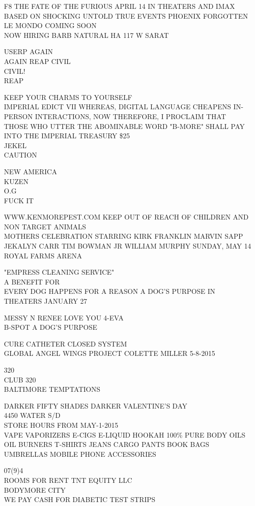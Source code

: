 \documentclass[10pt,letterpaper]{article}
\begin{document}
F8 THE FATE OF THE FURIOUS APRIL 14 IN THEATERS AND IMAX\\
BASED ON SHOCKING UNTOLD TRUE EVENTS PHOENIX FORGOTTEN\\
LE MONDO COMING SOON\\
NOW HIRING BARB NATURAL HA 117 W SARAT

USERP AGAIN\\
AGAIN REAP CIVIL\\
CIVIL!\\
REAP

KEEP YOUR CHARMS TO YOURSELF\\
IMPERIAL EDICT VII WHEREAS, DIGITAL LANGUAGE CHEAPENS IN{-}PERSON INTERACTIONS, NOW THEREFORE, I PROCLAIM THAT THOSE WHO UTTER THE ABOMINABLE WORD "B{-}MORE" SHALL PAY INTO THE IMPERIAL TREASURY \$25\\
JEKEL\\
CAUTION

NEW AMERICA\\
KUZEN\\
O.G\\
FUCK IT

WWW.KENMOREPEST.COM KEEP OUT OF REACH OF CHILDREN AND NON TARGET ANIMALS\\
MOTHERS CELEBRATION STARRING KIRK FRANKLIN MARVIN SAPP JEKALYN CARR TIM BOWMAN JR WILLIAM MURPHY SUNDAY, MAY 14 ROYAL FARMS ARENA

"EMPRESS CLEANING SERVICE"\\
A BENEFIT FOR\\
EVERY DOG HAPPENS FOR A REASON A DOG'S PURPOSE IN THEATERS JANUARY 27

MESSY N RENEE LOVE YOU 4{-}EVA\\
B{-}SPOT A DOG'S PURPOSE

CURE CATHETER CLOSED SYSTEM\\
GLOBAL ANGEL WINGS PROJECT COLETTE MILLER 5{-}8{-}2015

320\\
CLUB 320\\
BALTIMORE TEMPTATIONS

DARKER FIFTY SHADES DARKER VALENTINE'S DAY\\
4450 WATER S/D\\
STORE HOURS FROM MAY{-}1{-}2015\\
VAPE VAPORIZERS E{-}CIGS E{-}LIQUID HOOKAH 100\% PURE BODY OILS OIL BURNERS T{-}SHIRTS JEANS CARGO PANTS BOOK BAGS UMBRELLAS MOBILE PHONE ACCESSORIES

07(9)4\\
ROOMS FOR RENT TNT EQUITY LLC\\
BODYMORE CITY\\
WE PAY CASH FOR DIABETIC TEST STRIPS
\end{document}
